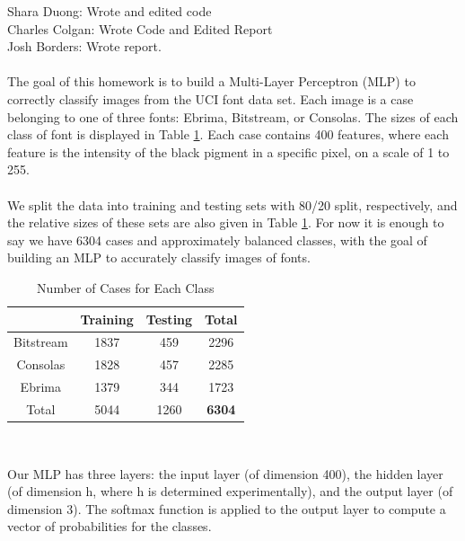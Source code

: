 \documentclass{homework}
\begin{document}
\maketitle

Shara Duong: Wrote and edited code\\
Charles Colgan: Wrote Code and Edited Report\\
Josh Borders: Wrote report. \\\\

The goal of this homework is to build a Multi-Layer Perceptron (MLP) to correctly classify images from the UCI font data set. Each image is a case belonging to one of three fonts: Ebrima, Bitstream, or Consolas. The sizes of each class of font is displayed in Table \ref{classes}. Each case contains 400 features, where each feature is the intensity of the black pigment in a specific pixel, on a scale of 1 to 255.\\\\
We split the data into training and testing sets with 80/20 split, respectively, and the relative sizes of these sets are also given in Table \ref{classes}. For now it is enough to say we have 6304 cases and approximately balanced classes, with the goal of building an MLP to accurately classify images of fonts.

\begin{table}[H]
    \centering
    {\begin{tabular}{c|cc|c}
         &Training&Testing&Total\\
         \hline
         Bitstream&1837&459&2296\\
         Consolas&1828&457&2285\\
         Ebrima&1379&344&1723\\
         \hline
         Total&5044&1260&\textbf{6304}
    \end{tabular}}\\
    \caption{Number of Cases for Each Class}
    \label{classes}
\end{table}

Our MLP has three layers: the input layer (of dimension 400), the hidden layer (of dimension h, where h is determined experimentally), and the output layer (of dimension 3). The softmax function is applied to the output layer to compute a vector of probabilities for the classes. 
\end{document}
